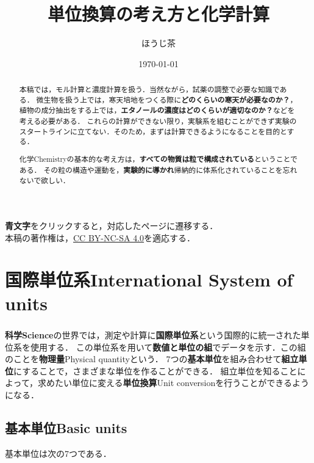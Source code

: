\documentclass[a4paper,11pt]{ltjsarticle}
\title{\textbf{単位換算の考え方と化学計算}}
\author{ほうじ茶}
\date{\today}
\numberwithin{equation}{section}
\renewcommand{\cite}[1]{\textsuperscript{\citep{#1}}}
\begin{document}
\maketitle

\begin{abstract}
  本稿では，モル計算と濃度計算を扱う．当然ながら，試薬の調整で必要な知識である．
  微生物を扱う上では，寒天培地をつくる際に\textbf{どのくらいの寒天が必要なのか？}，植物の成分抽出をする上では，\textbf{エタノールの濃度はどのくらいが適切なのか？}などを考える必要がある．
  これらの計算ができない限り，実験系を組むことができず実験のスタートラインに立てない．そのため，まずは計算できるようになることを目的とする．

  化学Chemistryの基本的な考え方は，\textbf{すべての物質は粒で構成されている}ということである．
  その粒の構造や運動を，\textbf{実験的に導かれ}帰納的に体系化されていることを忘れないで欲しい．
\end{abstract}

\tableofcontents

\vspace{12pt}

\begin{center}
  \textbf{\color{blue}青文字}をクリックすると，対応したページに遷移する．\\
  本稿の著作権は，\href{https://creativecommons.org/licenses/by-nc-sa/4.0}{CC BY-NC-SA 4.0}を適応する．
\end{center}

\cleardoublepage

\section{国際単位系International System of units}
\label{sec: si}

\textbf{科学Science}の世界では，測定や計算に\textbf{国際単位系}\cite{units-1}という国際的に統一された単位系を使用する．
この単位系を用いて\textbf{数値と単位の組}でデータを示す．この組のことを\textbf{物理量}Physical quantityという．
7つの\textbf{基本単位}を組み合わせて\textbf{組立単位}にすることで，さまざまな単位を作ることができる．
組立単位を知ることによって，求めたい単位に変える\textbf{単位換算}Unit conversionを行うことができるようになる．

\subsection{基本単位Basic units}
\label{sec: basic units}

基本単位は次の7つである．
\end{document}
